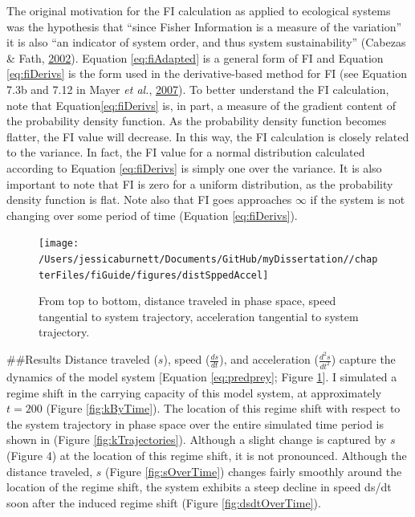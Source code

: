 \documentclass[12pt,twoside,openany]{reedthesis}
\begin{document}
The original motivation for the FI calculation as applied to ecological systems was the hypothesis that ``since Fisher Information is a measure of the variation'' it is also ``an indicator of system order, and thus system sustainability'' (Cabezas \& Fath, \protect\hyperlink{ref-cabezas_towards_2002}{2002}). Equation \eqref{eq:fiAdapted} is a general form of FI and Equation \eqref{eq:fiDerivs} is the form used in the derivative-based method for FI (see Equation 7.3b and 7.12 in Mayer \emph{et al.}, \protect\hyperlink{ref-mayer_applications_2007}{2007}). To better understand the FI calculation, note that Equation\eqref{eq:fiDerivs} is, in part, a measure of the gradient content of the probability density function. As the probability density function becomes flatter, the FI value will decrease. In this way, the FI calculation is closely related to the variance. In fact, the FI value for a normal distribution calculated according to Equation \eqref{eq:fiDerivs} is simply one over the variance. It is also important to note that FI is zero for a uniform distribution, as the probability density function is flat. Note also that FI goes approaches \(\infty\) if the system is not changing over some period of time (Equation \eqref{eq:fiDerivs}).
\begin{figure}[bth]

{\centering \texttt{[image: /Users/jessicaburnett/Documents/GitHub/myDissertation//chapterFiles/fiGuide/figures/distSppedAccel]} 

}

\caption{From top to bottom, distance traveled in phase space, speed tangential to system trajectory, acceleration tangential to system trajectory.}\label{fig:distSpeedAccel}
\end{figure}
\#\#Results
Distance traveled (\(s\)), speed (\(\frac{ds}{dt}\)), and acceleration (\(\frac{d^2 s}{dt^2}\)) capture the dynamics of the model system {[}Equation \eqref{eq:predprey}; Figure \ref{fig:distSpeedAccel}{]}. I simulated a regime shift in the carrying capacity of this model system, at approximately \(t=200\) (Figure \ref{fig:kByTime}). The location of this regime shift with respect to the system trajectory in phase space over the entire simulated time period is shown in (Figure \ref{fig:kTrajectories}). Although a slight change is captured by \(s\) (Figure 4) at the location of this regime shift, it is not pronounced. Although the distance traveled, \(s\) (Figure \ref{fig:sOverTime}) changes fairly smoothly around the location of the regime shift, the system exhibits a steep decline in speed ds/dt soon after the induced regime shift (Figure \ref{fig:dsdtOverTime}).
\end{document}
